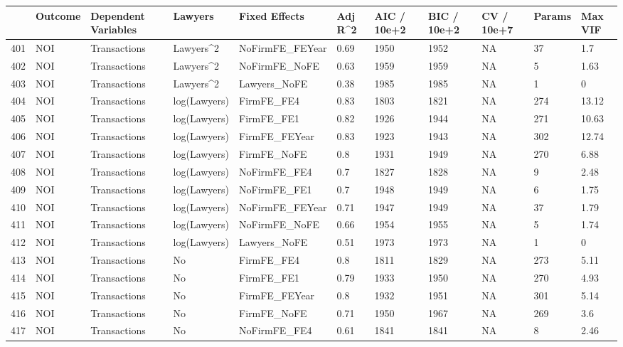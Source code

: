 \documentclass{article}
\begin{document}
\begin{table}[H]
\centering
\begin{tabular}{rllllllllll}
  \hline
 & Outcome & Dependent Variables & Lawyers & Fixed Effects & Adj R^2 & AIC / 10e+2 & BIC / 10e+2 & CV / 10e+7 & Params & Max VIF \\
  \hline
401 & NOI & Transactions & Lawyers^2 & NoFirmFE\_FEYear & 0.69 & 1950 & 1952 & NA & 37 & 1.7 \\
  402 & NOI & Transactions & Lawyers^2 & NoFirmFE\_NoFE & 0.63 & 1959 & 1959 & NA & 5 & 1.63 \\
  403 & NOI & Transactions & Lawyers^2 & Lawyers\_NoFE & 0.38 & 1985 & 1985 & NA & 1 & 0 \\
  404 & NOI & Transactions & log(Lawyers) & FirmFE\_FE4 & 0.83 & 1803 & 1821 & NA & 274 & 13.12 \\
  405 & NOI & Transactions & log(Lawyers) & FirmFE\_FE1 & 0.82 & 1926 & 1944 & NA & 271 & 10.63 \\
  406 & NOI & Transactions & log(Lawyers) & FirmFE\_FEYear & 0.83 & 1923 & 1943 & NA & 302 & 12.74 \\
  407 & NOI & Transactions & log(Lawyers) & FirmFE\_NoFE & 0.8 & 1931 & 1949 & NA & 270 & 6.88 \\
  408 & NOI & Transactions & log(Lawyers) & NoFirmFE\_FE4 & 0.7 & 1827 & 1828 & NA & 9 & 2.48 \\
  409 & NOI & Transactions & log(Lawyers) & NoFirmFE\_FE1 & 0.7 & 1948 & 1949 & NA & 6 & 1.75 \\
  410 & NOI & Transactions & log(Lawyers) & NoFirmFE\_FEYear & 0.71 & 1947 & 1949 & NA & 37 & 1.79 \\
  411 & NOI & Transactions & log(Lawyers) & NoFirmFE\_NoFE & 0.66 & 1954 & 1955 & NA & 5 & 1.74 \\
  412 & NOI & Transactions & log(Lawyers) & Lawyers\_NoFE & 0.51 & 1973 & 1973 & NA & 1 & 0 \\
  413 & NOI & Transactions & No & FirmFE\_FE4 & 0.8 & 1811 & 1829 & NA & 273 & 5.11 \\
  414 & NOI & Transactions & No & FirmFE\_FE1 & 0.79 & 1933 & 1950 & NA & 270 & 4.93 \\
  415 & NOI & Transactions & No & FirmFE\_FEYear & 0.8 & 1932 & 1951 & NA & 301 & 5.14 \\
  416 & NOI & Transactions & No & FirmFE\_NoFE & 0.71 & 1950 & 1967 & NA & 269 & 3.6 \\
  417 & NOI & Transactions & No & NoFirmFE\_FE4 & 0.61 & 1841 & 1841 & NA & 8 & 2.46 \\

\end{tabular}
\end{table}
\end{document}
